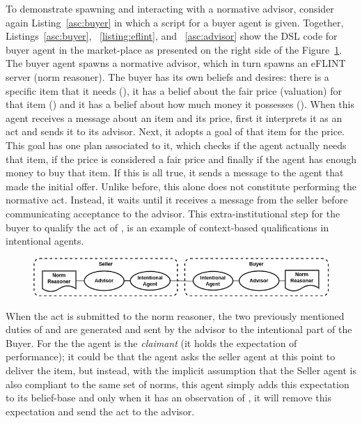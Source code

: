 To demonstrate spawning and interacting with a normative advisor, consider again Listing~\ref{asc:buyer} in which a script for a buyer agent is given.
%
Together, Listings~\ref{asc:buyer}, ~\ref{listing:eflint}, and ~\ref{asc:advisor} show the DSL code for buyer agent in the market-place as presented on the right side of the Figure~\ref{fig:non-gov}.
%
The buyer agent spawns a normative advisor, which in turn spawns an eFLINT server (norm reasoner). 
%
The buyer has its own beliefs and desires: there is a specific item that it needs (), it has a belief about the fair price (valuation) for that item () and it has a belief about how much money it possesses ().
%
When this agent receives a  message about an item and its price, first it interprets it as an  act and sends it to its advisor. Next, it adopts a goal of  that item for the price. This goal has one plan associated to it, which checks if the agent actually needs that item, if the price is considered a fair price and finally if the agent has enough money to buy that item. If this is all true, it sends a  message to the agent that made the initial offer. Unlike before, this alone does not constitute performing the normative  act. Instead, it waits until it receives a  message from the seller before communicating acceptance to the advisor. This extra-institutional step for the buyer to qualify the act of , is an example of context-based qualifications in intentional agents.

\begin{figure}[!tb]
  \centering
  \includegraphics[width=.8\textwidth]{ch_eumas/ad-hoc.drawio.png}
  \label{fig:non-gov}
\end{figure}

When the  act is submitted to the norm reasoner, the two previously mentioned duties of  and  are generated and sent by the advisor to the intentional part of the Buyer. For the  the agent is the \textit{claimant} (it holds the expectation of performance); it could be that the agent asks the seller agent at this point to deliver the item, but instead, with the implicit assumption that the Seller agent is also compliant to the same set of norms, this agent simply adds this expectation to its belief-base and only when it has an observation of , it will remove this expectation and send the  act to the advisor. 

